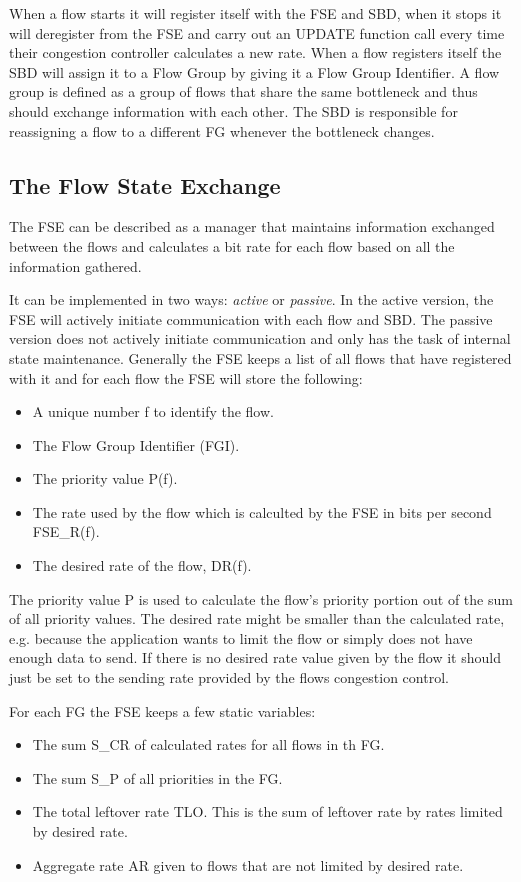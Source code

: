 \documentclass[UKenglish]{ifimaster}
\begin{document}
When a flow starts it will register itself with the FSE and SBD, when it stops it will deregister from the FSE and carry out an UPDATE function call every time their congestion controller calculates a new rate.
When a flow registers itself the SBD will assign it to a Flow Group by giving it a Flow Group Identifier.
A flow group is defined as a group of flows that share the same bottleneck and thus should exchange information with each other. 
The SBD is responsible for reassigning a flow to a different FG whenever the bottleneck changes.

\subsection{The Flow State Exchange}
The FSE can be described as a manager that maintains information exchanged between the flows and calculates a bit rate for each flow based on all the information gathered. 

It can be implemented in two ways: \textit{active} or \textit{passive}.
In the active version, the FSE will actively initiate communication with each flow and SBD. 
The passive version does not actively initiate communication and only has the task of internal state maintenance.
Generally the FSE keeps a list of all flows that have registered with it and for each flow the FSE will store the following:
\begin{itemize}
    \item A unique number f to identify the flow.
    \item The Flow Group Identifier (FGI).
    \item The priority value P(f).
    \item The rate used by the flow which is calculted by the FSE in bits per second FSE\_R(f).
    \item The desired rate of the flow, DR(f).
\end{itemize}

The priority value P is used to calculate the flow's priority portion out of the sum of all priority values.
The desired rate might be smaller than the calculated rate, e.g. because the application wants to limit the flow or simply does not have enough data to send. 
If there is no desired rate value given by the flow it should just be set to the sending rate provided by the flows congestion control.

For each FG the FSE keeps a few static variables:
\begin{itemize}
    \item The sum S\_CR of calculated rates for all flows in th FG.
    \item The sum S\_P of all priorities in the FG.
    \item The total leftover rate TLO. This is the sum of leftover rate by rates limited by desired rate.
    \item Aggregate rate AR given to flows that are not limited by desired rate. 
\end{itemize}
\end{document}
